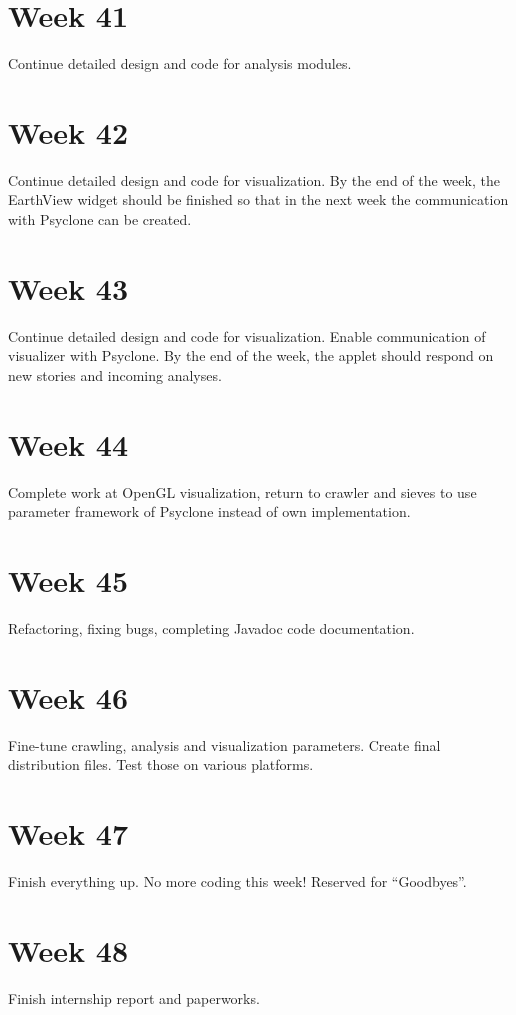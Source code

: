 \section{Week 41}

Continue detailed design and code for analysis modules.

\section{Week 42}

Continue detailed design and code for visualization. By the end of the week,
the EarthView widget should be finished so that in the next week the
communication with Psyclone can be created.

\section{Week 43}

Continue detailed design and code for visualization. Enable communication of
visualizer with Psyclone. By the end of the week, the applet should respond on
new stories and incoming analyses.

\section{Week 44}

Complete work at OpenGL visualization, return to crawler and sieves to use
parameter framework of Psyclone instead of own implementation.

\section{Week 45}

Refactoring, fixing bugs, completing Javadoc code documentation.

\section{Week 46}

Fine-tune crawling, analysis and visualization parameters. Create final
distribution files. Test those on various platforms.

\section{Week 47}

Finish everything up. No more coding this week! Reserved for ``Goodbyes''.

\section{Week 48}

Finish internship report and paperworks.

